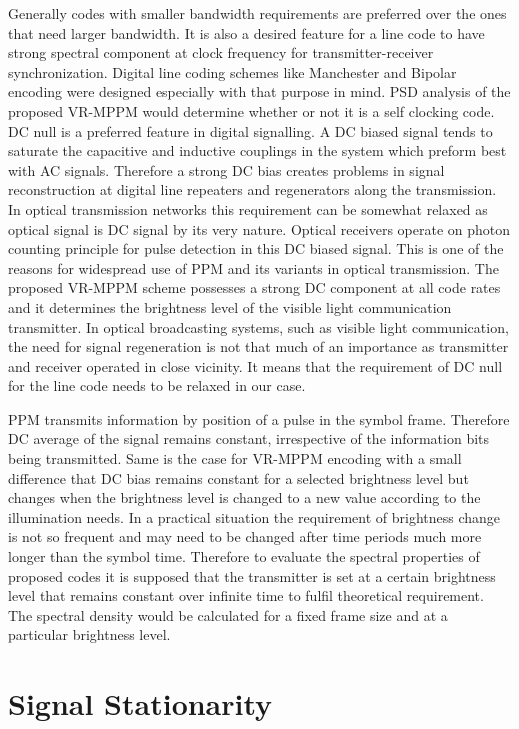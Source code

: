 Generally codes with smaller bandwidth requirements are preferred over the ones that need larger bandwidth. It is also a desired feature for a line code to have strong spectral component at clock frequency for transmitter-receiver synchronization. Digital line coding schemes like Manchester and Bipolar encoding were designed especially with that purpose in mind. PSD analysis of the proposed VR-MPPM would determine whether or not it is a self clocking code. DC null is a preferred feature in digital signalling. A DC biased signal tends to saturate the capacitive and inductive couplings in the system which preform best with AC signals. Therefore a strong DC bias creates problems in signal reconstruction at digital line repeaters and regenerators along the transmission. In optical transmission networks this requirement can be somewhat relaxed as optical signal is DC signal by its very nature. Optical receivers operate on photon counting principle for pulse detection in this DC biased signal. This is one of the reasons for widespread use of PPM and its variants in optical transmission. The proposed VR-MPPM scheme possesses a strong DC component at all code rates and it determines the brightness level of the visible light communication transmitter. In optical broadcasting systems, such as visible light communication, the need for signal regeneration is not that much of an importance as transmitter and receiver operated in close vicinity. It means that the requirement of DC null for the line code needs to be relaxed in our case.

PPM transmits information by position of a pulse in the symbol frame. Therefore DC average of  the signal remains constant, irrespective of the information bits being transmitted. Same is the case for VR-MPPM encoding with a small difference that DC bias remains constant for a selected brightness level but changes when the brightness level is changed to a new value according to the illumination needs. In a practical situation the requirement of brightness change is not so frequent and may need to be changed after time periods much more longer than the symbol time. Therefore to evaluate the spectral properties of proposed codes it is supposed that the transmitter is set at a certain brightness level that remains constant over infinite time to fulfil  theoretical requirement. The spectral density would be calculated for a fixed frame size and at a particular brightness level.

\section{Signal Stationarity}


